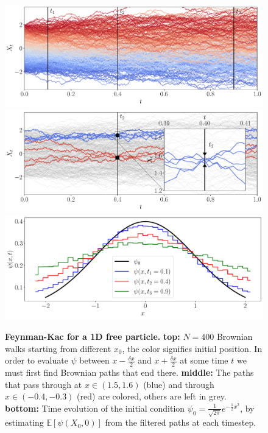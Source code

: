 \begin{figure}[H]
	\centering
	\subfloat
	{\includegraphics[width = \linewidth]{Chapter2/Figs/Raster/fkac_vs_fplanck_top.pdf}} \\
	\subfloat
	{\includegraphics[width = \linewidth]{Chapter2/Figs/Raster/fkac_vs_fplanck_mid1.pdf}} \\
	\subfloat
	{\includegraphics[width = \linewidth]{Chapter2/Figs/Raster/fkac_vs_fplanck_bottom.pdf}}
	
	\caption[Feynman-Kac for a 1D free particle]{\textbf{Feynman-Kac for a 1D free particle.} \textbf{top:} $N=400$ Brownian walks starting from different $x_0$, the color signifies initial position. In order to evaluate $\psi$ between $x-\frac{\delta x}{2}$ and $x+\frac{\delta x}{2}$ at some time $t$ we must first find Brownian paths that end there. \textbf{middle:} The paths that pass through at $x \in (1.5, 1.6)$ (blue) and through $x \in (-0.4,-0.3)$ (red) are colored, others are left in grey. \textbf{bottom:} Time evolution of the initial condition $\psi_{0} = \frac{1}{\sqrt{2 \pi}} e^{-\frac{1}{2} x^{2}}$, by estimating ${\mathbb{E}}\left[\psi\left(X_{0}, 0\right)\right]$ from the filtered paths at each timestep.}
	\label{fig:fk_1d_example}
\end{figure}
